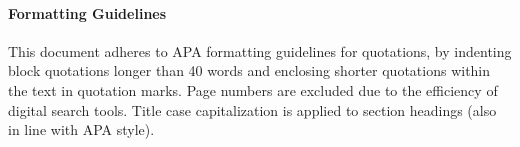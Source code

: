 \paragraph{Formatting Guidelines}
This document adheres to APA formatting guidelines for quotations, by indenting block quotations longer than 40 words and enclosing shorter quotations within the text in quotation marks. Page numbers are excluded due to the efficiency of digital search tools. Title case capitalization is applied to section headings (also in line with APA style).

